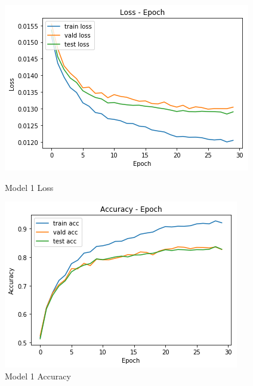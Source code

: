 \documentclass{article}
\begin{document}
\begin{figure}[h]
\begin{minipage}{0.48\textwidth}
\centering
\includegraphics[width=\textwidth]{pics/1_loss.png}
\caption{Model 1 Loss}
\end{minipage}
\hfill
\begin{minipage}{0.48\textwidth}
\centering
\includegraphics[width=\textwidth]{pics/1_acc.png}
\caption{Model 1 Accuracy}
\end{minipage}


\end{figure}
\end{document}
